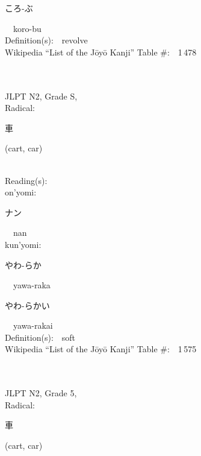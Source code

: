 \begin{multicols}{2}
{\hspace*{2em}}{\begin{CJK}{UTF8}{min} ころ-ぶ \end{CJK}}\ \ koro-bu\ \ \\
Definition(s):\ \ revolve \\
Wikipedia ``List of the J\=oy\=o Kanji'' Table \#:\ \ 1\,478 \\
\ \ \\
{\fontsize{34pt}{40pt}  }\ \ \\  %
{JLPT N2, Grade S, \\Radical:\ \ {\begin{CJK}{UTF8}{min} 車 \end{CJK}} (cart, car) } \\
Reading(s):\ \ \\
{\hspace*{1em}}on'yomi:\ \ \\
{\hspace*{2em}}{\begin{CJK}{UTF8}{min} ナン \end{CJK}}\ \ nan\ \ \\
{\hspace*{1em}}kun'yomi:\ \ \\
{\hspace*{2em}}{\begin{CJK}{UTF8}{min} やわ-らか \end{CJK}}\ \ yawa-raka\ \ \\
{\hspace*{2em}}{\begin{CJK}{UTF8}{min} やわ-らかい \end{CJK}}\ \ yawa-rakai\ \ \\
Definition(s):\ \ soft \\
Wikipedia ``List of the J\=oy\=o Kanji'' Table \#:\ \ 1\,575 \\
\ \ \\
{\fontsize{34pt}{40pt}  }\ \ \\  %
{JLPT N2, Grade 5, \\Radical:\ \ {\begin{CJK}{UTF8}{min} 車 \end{CJK}} (cart, car) } \\

\end{multicols}

